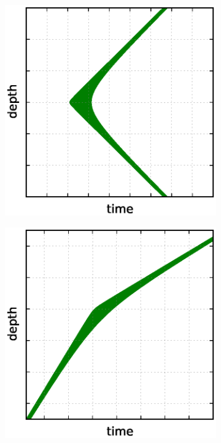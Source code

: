 \documentclass[../Main.tex]{subfiles}
\begin{document}
\begin{figure}[!tbph]
\begin{subfigure}[b]{0.32\textwidth}
    \includegraphics[width=\textwidth]{hyperbolas1}
  \end{subfigure}\hfill
  \begin{subfigure}[b]{0.32\textwidth}
    \centering
    \includegraphics[width=\textwidth]{hyperbolas2}

\end{subfigure}
\end{figure}
\end{document}
